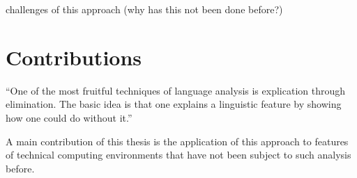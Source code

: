 challenges of this approach
(why has this not been done before?)


\section{Contributions}

``One of the most fruitful techniques of language analysis is explication through
elimination. The basic idea is that one explains a linguistic feature by showing
how one could do without it.'' \cite{morris}

A main contribution of this thesis is the application of this approach to features
of technical computing environments that have not been subject to such analysis
before.
